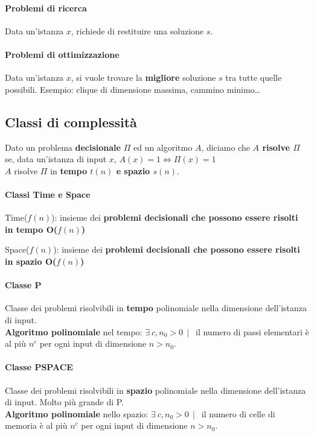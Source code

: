 \documentclass[10pt]{book}
\begin{document}
\paragraph{Problemi di ricerca} Data un'istanza $x$, richiede di restituire una soluzione $s$.
\paragraph{Problemi di ottimizzazione} Data un'istanza $x$, si vuole trovare la \textbf{migliore} soluzione $s$ tra tutte quelle possibili. Esempio: clique di dimensione massima, cammino minimo\ldots
\subsection{Classi di complessità}
Dato un problema \textbf{decisionale} $\Pi$ ed un algoritmo $A$, diciamo che \textbf{$A$ risolve $\Pi$} se, data un'istanza di input $x$, $A(x) = 1 \Leftrightarrow \Pi(x) = 1$\\
$A$ risolve $\Pi$ in \textbf{tempo $t(n)$ e spazio $s(n)$}.
\paragraph{Classi Time e Space}
\begin{list}{}{}
	\item Time($f(n)$): insieme dei \textbf{problemi decisionali che possono essere risolti in tempo O($f(n)$)}
	\item Space($f(n)$): insieme dei \textbf{problemi decisionali che possono essere risolti in spazio O($f(n)$)}
\end{list}
\paragraph{Classe P} Classe dei problemi risolvibili in \textbf{tempo} polinomiale nella dimensione dell'istanza di input.\\
\textbf{Algoritmo polinomiale} nel tempo: $\exists\:c, n_0 > 0\:\:|\:\:$ il numero di passi elementari è al più $n^c$ per ogni input di dimensione $n > n_0$.
\paragraph{Classe PSPACE} Classe dei problemi risolvibili in \textbf{spazio} polinomiale nella dimensione dell'istanza di input. Molto più grande di P.\\
\textbf{Algoritmo polinomiale} nello spazio: $\exists\:c, n_0 > 0\:\:|\:\:$ il numero di celle di memoria è al più $n^c$ per ogni input di dimensione $n > n_0$.
\end{document}
